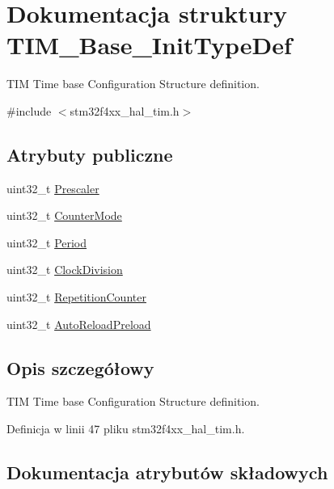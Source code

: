 \hypertarget{struct_t_i_m___base___init_type_def}{}\section{Dokumentacja struktury T\+I\+M\+\_\+\+Base\+\_\+\+Init\+Type\+Def}
\label{struct_t_i_m___base___init_type_def}


T\+IM Time base Configuration Structure definition.  




{\ttfamily \#include $<$stm32f4xx\+\_\+hal\+\_\+tim.\+h$>$}

\subsection*{Atrybuty publiczne}
\begin{DoxyCompactItemize}
\item 
uint32\+\_\+t \hyperlink{struct_t_i_m___base___init_type_def_afc886119e6709bb576d25b5cf8d12d92}{Prescaler}
\item 
uint32\+\_\+t \hyperlink{struct_t_i_m___base___init_type_def_a16d0c02a8f35426360a64c0706656e35}{Counter\+Mode}
\item 
uint32\+\_\+t \hyperlink{struct_t_i_m___base___init_type_def_a8fab2bc184bb756763ff59c729b5be55}{Period}
\item 
uint32\+\_\+t \hyperlink{struct_t_i_m___base___init_type_def_ade59c3a547a5409da845592f30596d17}{Clock\+Division}
\item 
uint32\+\_\+t \hyperlink{struct_t_i_m___base___init_type_def_aa949328175500fd1d112f64a4db5ae79}{Repetition\+Counter}
\item 
uint32\+\_\+t \hyperlink{struct_t_i_m___base___init_type_def_a29e7b91a384f12e6be0f3ffb62ea1ea7}{Auto\+Reload\+Preload}
\end{DoxyCompactItemize}


\subsection{Opis szczegółowy}
T\+IM Time base Configuration Structure definition. 

Definicja w linii 47 pliku stm32f4xx\+\_\+hal\+\_\+tim.\+h.



\subsection{Dokumentacja atrybutów składowych}
\mbox{\label{struct_t_i_m___base___init_type_def_a29e7b91a384f12e6be0f3ffb62ea1ea7}} 
